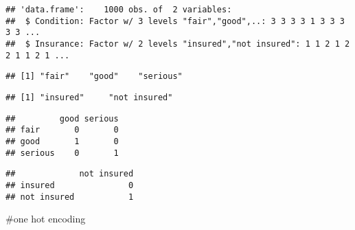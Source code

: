\documentclass[
]{article}
\newenvironment{Shaded}{\begin{snugshade}}{\end{snugshade}}
\newcommand{\FunctionTok}[1]{\textcolor[rgb]{0.13,0.29,0.53}{\textbf{#1}}}
\newcommand{\NormalTok}[1]{#1}
\newcommand{\SpecialCharTok}[1]{\textcolor[rgb]{0.81,0.36,0.00}{\textbf{#1}}}
\begin{document}
\begin{verbatim}
## 'data.frame':    1000 obs. of  2 variables:
##  $ Condition: Factor w/ 3 levels "fair","good",..: 3 3 3 3 1 3 3 3 3 3 ...
##  $ Insurance: Factor w/ 2 levels "insured","not insured": 1 1 2 1 2 2 1 1 2 1 ...
\end{verbatim}

\begin{Shaded}
\end{Shaded}

\begin{verbatim}
## [1] "fair"    "good"    "serious"
\end{verbatim}

\begin{Shaded}
\end{Shaded}

\begin{verbatim}
## [1] "insured"     "not insured"
\end{verbatim}

\begin{Shaded}
\end{Shaded}

\begin{verbatim}
##         good serious
## fair       0       0
## good       1       0
## serious    0       1
\end{verbatim}

\begin{Shaded}
\end{Shaded}

\begin{verbatim}
##             not insured
## insured               0
## not insured           1
\end{verbatim}

\#one hot encoding
\end{document}
